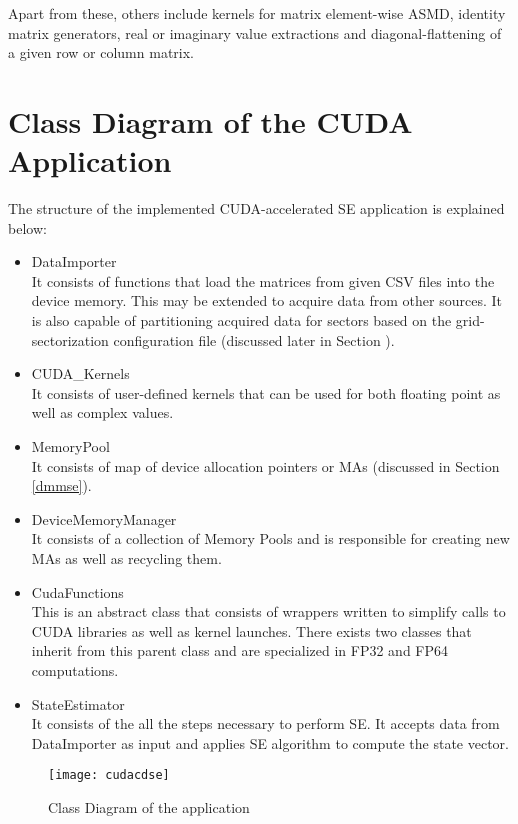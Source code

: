 \documentclass[thesis.tex]{subfiles}
\begin{document}
Apart from these, others include kernels for matrix element-wise ASMD, identity matrix generators, real or imaginary value extractions and diagonal-flattening of a given row or column matrix.

\section{Class Diagram of the CUDA Application}\label{sec:classdiagram}
The structure of the implemented CUDA-accelerated SE application is explained below:
\begin{itemize}
	\item DataImporter\\It consists of functions that load the matrices from given CSV files into the device memory. This may be extended to acquire data from other sources. It is also capable of partitioning acquired data for sectors based on the grid-sectorization configuration file (discussed later in Section ).
	\item CUDA\_Kernels\\It consists of user-defined kernels that can be used for both floating point as well as complex values.
	\item MemoryPool\\It consists of map of device allocation pointers or MAs (discussed in Section \ref{dmmse}).
	\item DeviceMemoryManager\\It consists of a collection of Memory Pools and is responsible for creating new MAs as well as recycling them.
	\item CudaFunctions\\This is an abstract class that consists of wrappers written to simplify calls to CUDA libraries as well as kernel launches. There exists two classes that inherit from this parent class and are specialized in FP32 and FP64 computations.
	\item StateEstimator\\It consists of the all the steps necessary to perform SE. It accepts data from DataImporter as input and applies SE algorithm to compute the state vector.
\end{itemize}
\begin{figure}[H]
	\centering
	\texttt{[image: cudacdse]}
	\caption{Class Diagram of the application}
	\label{fig:cudacdse}
\end{figure}
\end{document}
